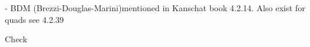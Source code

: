 
- BDM (Brezzi-Douglas-Marini)mentioned in Kanschat book 4.2.14. 
Also exist for quads see 4.2.39

Check \textcite{brfo}
